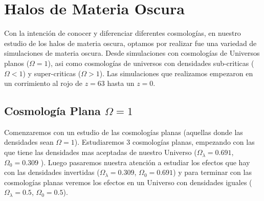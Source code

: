 \chapter{Halos de Materia Oscura}
\setcounter{equation}{0}

\noindent Con la intención de conocer y diferenciar diferentes cosmologías, en nuestro estudio de los halos de materia oscura, optamos por realizar fue una variedad de simulaciones de materia oscura. Desde simulaciones con cosmologías de Universos planos ($\Omega = 1$), asi como cosmologías  de universos con densidades sub-criticas ($\Omega < 1$) y super-criticas ($\Omega > 1$). Las simulaciones que realizamos empezaron en un corrimiento al rojo de $z=63$ hasta un $z=0$.

\section[Cosmología Plana \texorpdfstring{$\Omega = 1$}{Omega = 1}]{Cosmología Plana \texorpdfstring{$\Omega = 1$}{Omega = 1}}

\noindent Comenzaremos con un estudio de las cosmologías planas (aquellas donde las densidades sean $\Omega = 1$). Estudiaremos 3 cosmologías planas, empezando con las que tiene las densidades mas aceptadas de nuestro Universo ($\Omega_\lambda = 0.691$, $\Omega_0 = 0.309$  \cite{2020A&A...641A...1P}). Luego pasaremos nuestra atención a estudiar los efectos que hay con las densidades invertidas ($\Omega_\lambda = 0.309$, $\Omega_0 = 0.691$) y para terminar con las cosmologías planas veremos los efectos en un Universo con densidades iguales ($\Omega_\lambda = 0.5$, $\Omega_0 = 0.5$).

